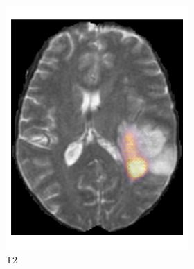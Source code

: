 \begin{figure}[htbp]
\begin{subfigure}[b]{\textwidth}
\begin{subfigure}[b]{0.24\textwidth}
        \includegraphics[width=\textwidth]{Figures/saliency_LGG_T2.png}
        \caption*{\acrshort{T2}\nopunct}
        \end{subfigure}
        \hfill
        \begin{subfigure}[b]{0.24\textwidth}

\end{subfigure}
\end{subfigure}
\end{figure}
